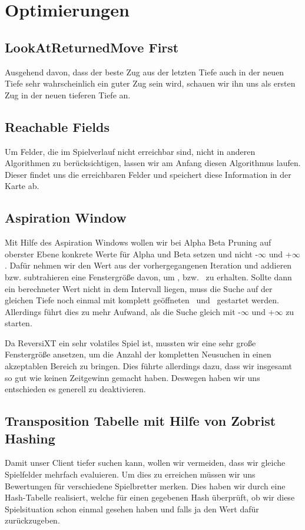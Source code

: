 \documentclass[12pt,a4paper,bibliography=totocnumbered,listof=totocnumbered]{article}
\begin{document}
\section{Optimierungen}
\subsection{LookAtReturnedMove First}
Ausgehend davon, dass der beste Zug aus der letzten Tiefe auch in der neuen Tiefe sehr wahrscheinlich ein guter Zug sein wird, schauen wir ihn uns als ersten Zug in der neuen tieferen Tiefe an.

\subsection{Reachable Fields}
Um Felder, die im Spielverlauf nicht erreichbar sind, nicht in anderen Algorithmen zu berücksichtigen, lassen wir am Anfang diesen Algorithmus laufen. Dieser findet uns die erreichbaren Felder und speichert diese Information in der Karte ab.

\subsection{Aspiration Window}
Mit Hilfe des Aspiration Windows wollen wir bei Alpha Beta Pruning auf oberster Ebene konkrete Werte für Alpha und Beta setzen und nicht  -$\infty$ und +$\infty$ . Dafür nehmen wir den Wert aus der vorhergegangenen Iteration und addieren bzw. subtrahieren eine Fenstergröße davon, um \textalpha, bzw. \textbeta\ zu erhalten. Sollte dann ein berechneter Wert nicht in dem Intervall liegen, muss die Suche auf der gleichen Tiefe noch einmal mit komplett geöffneten \textalpha\ und \textbeta\ gestartet werden. Allerdings führt dies zu mehr Aufwand, als die Suche gleich mit -$\infty$ und +$\infty$ zu starten.

Da ReversiXT ein sehr volatiles Spiel ist, mussten wir eine sehr große Fenstergröße ansetzen, um die Anzahl der kompletten Neusuchen in einen akzeptablen Bereich zu bringen. Dies führte allerdings dazu, dass wir insgesamt so gut wie keinen Zeitgewinn gemacht haben.
Deswegen haben wir uns entschieden es generell zu deaktivieren.

\subsection{Transposition Tabelle mit Hilfe von Zobrist Hashing}
Damit unser Client tiefer suchen kann, wollen wir vermeiden, dass wir gleiche Spielfelder mehrfach evaluieren. Um dies zu erreichen müssen wir uns Bewertungen für verschiedene Spielbretter merken.
Dies haben wir durch eine Hash-Tabelle realisiert, welche für einen gegebenen Hash überprüft, ob wir diese Spielsituation schon einmal gesehen haben und falls ja den Wert dafür zurückzugeben.
\end{document}
